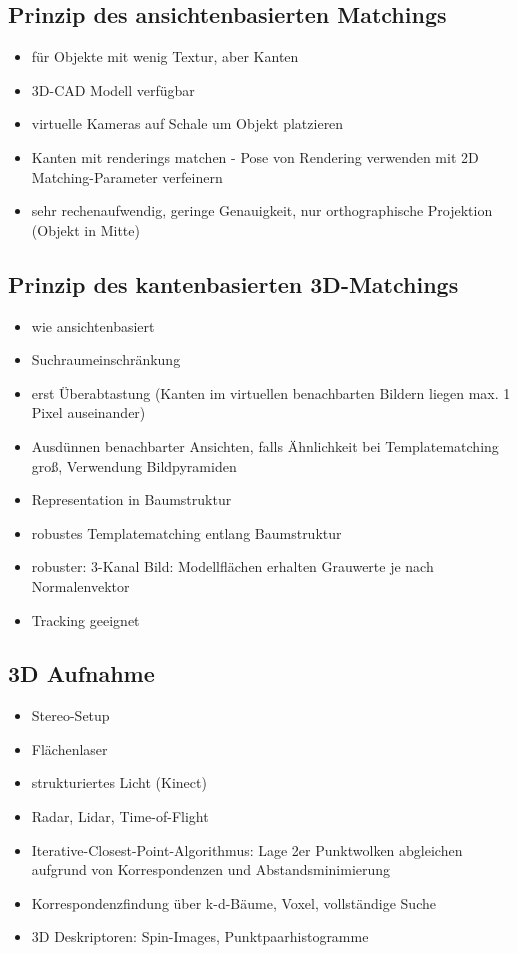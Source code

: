 \documentclass[11pt]{article}
\begin{document}
\subsection{Prinzip des ansichtenbasierten Matchings}
\begin{itemize}
    \item für Objekte mit wenig Textur, aber Kanten
    \item 3D-CAD Modell verfügbar
    \item virtuelle Kameras auf Schale um Objekt platzieren
    \item Kanten mit renderings matchen - Pose von Rendering verwenden mit 2D Matching-Parameter verfeinern
    \item sehr rechenaufwendig, geringe Genauigkeit, nur orthographische Projektion (Objekt in Mitte)
\end{itemize}

\subsection{Prinzip des kantenbasierten 3D-Matchings}
\begin{itemize}
    \item wie ansichtenbasiert
    \item Suchraumeinschränkung
    \item erst Überabtastung (Kanten im virtuellen benachbarten Bildern liegen max. 1 Pixel auseinander)
    \item Ausdünnen benachbarter Ansichten, falls Ähnlichkeit bei Templatematching groß, Verwendung Bildpyramiden
    \item Representation in Baumstruktur
    \item robustes Templatematching entlang Baumstruktur
    \item robuster: 3-Kanal Bild: Modellflächen erhalten Grauwerte je nach Normalenvektor
    \item Tracking geeignet
\end{itemize}

\subsection{3D Aufnahme}
\begin{itemize}
    \item Stereo-Setup
    \item Flächenlaser
    \item strukturiertes Licht (Kinect)
    \item Radar, Lidar, Time-of-Flight
    \item Iterative-Closest-Point-Algorithmus: Lage 2er Punktwolken abgleichen aufgrund von Korrespondenzen und Abstandsminimierung
    \item Korrespondenzfindung über k-d-Bäume, Voxel, vollständige Suche
    \item 3D Deskriptoren: Spin-Images, Punktpaarhistogramme
\end{itemize}
\end{document}

